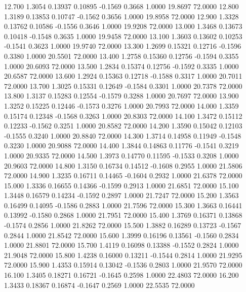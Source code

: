   12.700   1.3054   0.13937   0.10895  -0.1569   0.3668   1.0000  19.8697  72.0000
  12.800   1.3189   0.13853   0.10747  -0.1562   0.3656   1.0000  19.8958  72.0000
  12.900   1.3328   0.13762   0.10586  -0.1556   0.3646   1.0000  19.9208  72.0000
  13.000   1.3468   0.13673   0.10418  -0.1548   0.3635   1.0000  19.9458  72.0000
  13.100   1.3603   0.13602   0.10253  -0.1541   0.3623   1.0000  19.9740  72.0000
  13.300   1.2699   0.15321   0.12716  -0.1596   0.3380   1.0000  20.5501  72.0000
  13.400   1.2758   0.15360   0.12756  -0.1594   0.3355   1.0000  20.6093  72.0000
  13.500   1.2834   0.15374   0.12756  -0.1592   0.3335   1.0000  20.6587  72.0000
  13.600   1.2924   0.15363   0.12718  -0.1588   0.3317   1.0000  20.7011  72.0000
  13.700   1.3025   0.15331   0.12649  -0.1584   0.3301   1.0000  20.7378  72.0000
  13.800   1.3137   0.15283   0.12554  -0.1579   0.3288   1.0000  20.7697  72.0000
  13.900   1.3252   0.15225   0.12446  -0.1573   0.3276   1.0000  20.7993  72.0000
  14.000   1.3359   0.15174   0.12348  -0.1568   0.3263   1.0000  20.8303  72.0000
  14.100   1.3472   0.15112   0.12233  -0.1562   0.3251   1.0000  20.8582  72.0000
  14.200   1.3590   0.15042   0.12103  -0.1555   0.3240   1.0000  20.8840  72.0000
  14.300   1.3714   0.14958   0.11949  -0.1548   0.3230   1.0000  20.9088  72.0000
  14.400   1.3844   0.14863   0.11776  -0.1541   0.3219   1.0000  20.9335  72.0000
  14.500   1.3973   0.14770   0.11595  -0.1533   0.3208   1.0000  20.9603  72.0000
  14.800   1.3150   0.16734   0.14512  -0.1608   0.2955   1.0000  21.5806  72.0000
  14.900   1.3235   0.16711   0.14465  -0.1604   0.2932   1.0000  21.6378  72.0000
  15.000   1.3336   0.16655   0.14366  -0.1599   0.2913   1.0000  21.6851  72.0000
  15.100   1.3448   0.16579   0.14234  -0.1592   0.2897   1.0000  21.7247  72.0000
  15.200   1.3563   0.16499   0.14095  -0.1586   0.2883   1.0000  21.7596  72.0000
  15.300   1.3663   0.16441   0.13992  -0.1580   0.2868   1.0000  21.7951  72.0000
  15.400   1.3769   0.16371   0.13868  -0.1574   0.2856   1.0000  21.8262  72.0000
  15.500   1.3882   0.16289   0.13723  -0.1567   0.2844   1.0000  21.8542  72.0000
  15.600   1.3999   0.16196   0.13561  -0.1560   0.2834   1.0000  21.8801  72.0000
  15.700   1.4119   0.16098   0.13388  -0.1552   0.2824   1.0000  21.9048  72.0000
  15.800   1.4238   0.16000   0.13211  -0.1544   0.2814   1.0000  21.9295  72.0000
  15.900   1.4353   0.15914   0.13042  -0.1536   0.2803   1.0000  21.9570  72.0000
  16.100   1.3405   0.18271   0.16721  -0.1645   0.2598   1.0000  22.4803  72.0000
  16.200   1.3433   0.18367   0.16874  -0.1647   0.2569   1.0000  22.5535  72.0000

